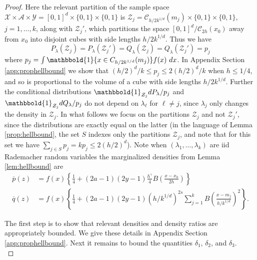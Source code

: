 \documentclass[11pt,twoside]{article}
\newcommand{\one}{\mathbbold{1}}
\theoremstyle{definition}
\theoremstyle{remark}
\begin{document}

\begin{proof}

Here the relevant partition of the sample space $\mathcal{X} \times \mathcal{A} \times \mathcal{Y} = [0,1]^d \times \{0,1\} \times \{0,1\}$ is  $\mathcal{Z}_j = \mathcal{C}_{h/2k^{1/d}}(m_j) \times \{0,1\} \times \{0,1\}$, $j=1,\dots,k$, along with $\mathcal{Z}_j'$, which partitions the space $[0,1]^d / \mathcal{C}_{2h}(x_0)$ away from $x_0$ into disjoint cubes with side lengths $h/2k^{1/d}$. 
Thus we have
$$ P_\lambda(\mathcal{Z}_j) = P_\lambda(\mathcal{Z}_j') = Q_\lambda(\mathcal{Z}_j) = Q_\lambda(\mathcal{Z}_j') = p_j $$
where $p_j =  \int \one\{x \in C_{h/2k^{1/d}}(m_j)\} f(x) \ dx$. In Appendix Section \ref{app:prophellbound} we show that $(h/2)^d/k \leq p_j \leq 2 (h/2)^d/k$ when $h \leq 1/4$, and so is proportional to the volume of a cube with side lengths $h/2k^{1/d}$. 
Further   the conditional distributions $\one_{\mathcal{Z}_j} dP_\lambda / p_j$ and $\one_{\mathcal{Z}_j} dQ_\lambda / p_j$ do not depend on $\lambda_\ell$ for $\ell \neq j$, since $\lambda_j$ only changes the density in $\mathcal{Z}_j$.  
In what follows we focus on the partitions $\mathcal{Z}_j$ and not $\mathcal{Z}_j'$, since the distributions are exactly equal on the latter (in the language of Lemma \ref{prop:hellbound}, the set $S$ indexes only the partitions $\mathcal{Z}_j$, and note that for this set we have $\sum_{j \in S} p_j=kp_j \leq 2 (h/2)^d$).  
 Note when $(\lambda_1,\dots,\lambda_k)$ are iid Rademacher random variables the marginalized densities from Lemma \ref{lem:hellbound} are
\begin{align*}
\overline{p}(z) &= f(x) \left\{ \frac{1}{4} +   (2a-1)(2y-1)  \frac{h^\gamma}{4} B\left( \frac{x-x_0}{2h} \right) \right\} \\
\overline{q}(z) &= f(x) \left\{ \frac{1}{4}  +  (2a-1)(2y-1)  \left( h/k^{1/d} \right)^{2s} \sum_{j=1}^k B \left( \frac{x-m_j}{h/k^{1/d}}  \right) ^2 \right\} .
\end{align*}

\bigskip

The first step is to show that relevant densities and density ratios are appropriately bounded. We give these details in Appendix Section \ref{app:prophellbound}. Next it remains to bound the quantities $\delta_1$, $\delta_2$, and $\delta_3$. \\



\end{proof}
\end{document}
